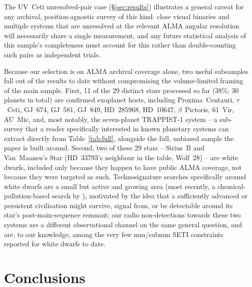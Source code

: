 \documentclass{openjournal}
\begin{document}
The UV~Ceti unresolved-pair case (\S\ref{sec:results}) illustrates a
general caveat for any archival, position-agnostic survey of this kind:
close visual binaries and multiple systems that are unresolved at the
relevant ALMA angular resolution will necessarily share a single
measurement, and any future statistical analysis of this sample's
completeness must account for this rather than double-counting such
pairs as independent trials.

Because our selection is on ALMA archival coverage alone, two useful
subsamples fall out of the results to date without compromising the
volume-limited framing of the main sample. First, 11 of the 29 distinct
stars processed so far (38\%; 30 planets in total) are confirmed
exoplanet hosts, including Proxima~Centauri, $\tau$~Ceti, GJ~674,
GJ~581, GJ~849, HD~285968, HD~10647, $\beta$~Pictoris, 61~Vir, AU~Mic,
and, most notably, the seven-planet TRAPPIST-1 system -- a sub-survey
that a reader specifically interested in known planetary systems can
extract directly from Table~\ref{tab:full}, alongside the full, unbiased
sample the paper is built around. Second, two of these 29 stars --
Sirius~B and Van~Maanen's Star (HD~33793's neighbour in the table,
Wolf~28) -- are white dwarfs, included only because they happen to have
public ALMA coverage, not because they were targeted as such.
Technosignature searches specifically around white dwarfs are a small
but active and growing area (most recently, a chemical-pollution-based
search by \citealt{PollutedWD2026}), motivated by the idea that a
sufficiently advanced or persistent civilisation might survive, signal
from, or be detectable around its star's post-main-sequence remnant;
our radio non-detections towards these two systems are a different
observational channel on the same general question, and are, to our
knowledge, among the very few mm/submm SETI constraints reported for
white dwarfs to date.

\section{Conclusions}
\label{sec:conclusions}
\end{document}
